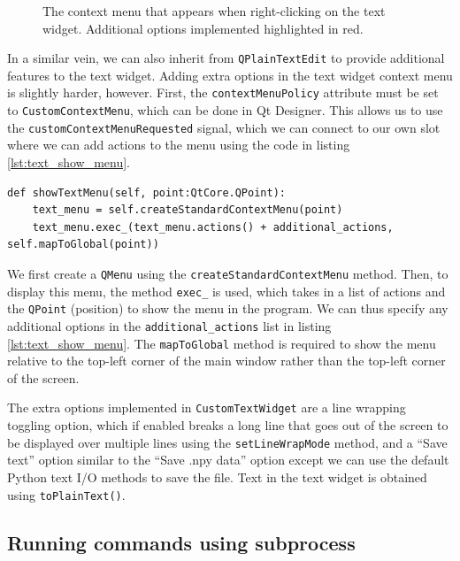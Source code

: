 \documentclass[12pt]{article}
\newenvironment{code}{\captionsetup{type=listing}}{\par\addvspace{\baselineskip}}
\begin{document}
\begin{figure}[h]
\begin{minipage}[t]{.47\textwidth}
        \caption{The context menu that appears when right-clicking on the text widget. Additional options implemented highlighted in red.}
        \label{fig:text_context_menu}
    \end{minipage}
\end{figure}

In a similar vein, we can also inherit from \texttt{QPlainTextEdit} to provide additional features to the text widget. Adding extra options in the text widget context menu is slightly harder, however. First, the \texttt{contextMenuPolicy} attribute must be set to \texttt{CustomContextMenu}, which can be done in Qt Designer. This allows us to use the \texttt{customContextMenuRequested} signal, which we can connect to our own slot where we can add actions to the menu using the code in listing \ref{lst:text_show_menu}.

\begin{code}\begin{verbatim}
def showTextMenu(self, point:QtCore.QPoint):
    text_menu = self.createStandardContextMenu(point)
    text_menu.exec_(text_menu.actions() + additional_actions, self.mapToGlobal(point))
\end{verbatim}
\caption{Code snippet to activate a custom menu in \texttt{CustomTextWidget}.}
\label{lst:text_show_menu}
\end{code}

We first create a \texttt{QMenu} using the \texttt{createStandardContextMenu} method. Then, to display this menu, the method \texttt{exec\_} is used, which takes in a list of actions and the \texttt{QPoint} (position) to show the menu in the program. We can thus specify any additional options in the \texttt{additional\_actions} list in listing \ref{lst:text_show_menu}. The \texttt{mapToGlobal} method is required to show the menu relative to the top-left corner of the main window rather than the top-left corner of the screen.

The extra options implemented in \texttt{CustomTextWidget} are a line wrapping toggling option, which if enabled breaks a long line that goes out of the screen to be displayed over multiple lines using the \texttt{setLineWrapMode} method, and a ``Save text'' option similar to the ``Save .npy data'' option except we can use the default Python text I/O methods to save the file. Text in the text widget is obtained using \texttt{toPlainText()}.

\subsection{Running commands using subprocess}\label{ssec:subprocess}
\end{document}
